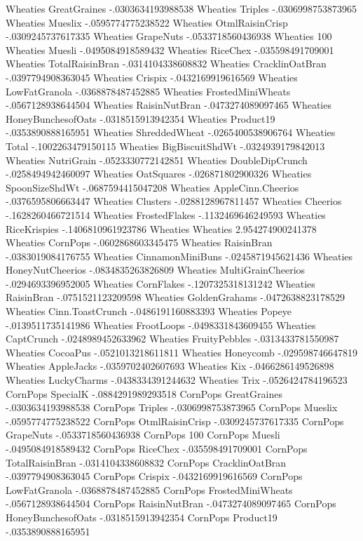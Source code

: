 Wheaties	GreatGraines	-.0303634193988538
Wheaties	Triples	-.0306998753873965
Wheaties	Mueslix	-.0595774775238522
Wheaties	OtmlRaisinCrisp	-.0309245737617335
Wheaties	GrapeNuts	-.0533718560436938
Wheaties	100%
Wheaties	Muesli	-.0495084918589432
Wheaties	RiceChex	-.035598491709001
Wheaties	TotalRaisinBran	-.0314104338608832
Wheaties	CracklinOatBran	-.0397794908363045
Wheaties	Crispix	-.0432169919616569
Wheaties	LowFatGranola	-.0368878487452885
Wheaties	FrostedMiniWheats	-.0567128938644504
Wheaties	RaisinNutBran	-.0473274089097465
Wheaties	HoneyBunchesofOats	-.0318515913942354
Wheaties	Product19	-.0353890888165951
Wheaties	ShreddedWheat	-.0265400538906764
Wheaties	Total	-.1002263479150115
Wheaties	BigBiscuitShdWt	-.0324939179842013
Wheaties	NutriGrain	-.0523330772142851
Wheaties	DoubleDipCrunch	-.0258494942460097
Wheaties	OatSquares	-.026871802900326
Wheaties	SpoonSizeShdWt	-.0687594415047208
Wheaties	AppleCinn.Cheerios	-.0376595806663447
Wheaties	Clusters	-.0288128967811457
Wheaties	Cheerios	-.1628260466721514
Wheaties	FrostedFlakes	-.1132469646249593
Wheaties	RiceKrispies	-.1406810961923786
Wheaties	Wheaties	2.954274900241378
Wheaties	CornPops	-.0602868603345475
Wheaties	RaisinBran	-.0383019084176755
Wheaties	CinnamonMiniBuns	-.0245871945621436
Wheaties	HoneyNutCheerios	-.0834835263826809
Wheaties	MultiGrainCheerios	-.0294693396952005
Wheaties	CornFlakes	-.1207325318131242
Wheaties	RaisinBran	-.0751521123209598
Wheaties	GoldenGrahams	-.0472638823178529
Wheaties	Cinn.ToastCrunch	-.0486191160883393
Wheaties	Popeye	-.0139511735141986
Wheaties	FrootLoops	-.0498331843609455
Wheaties	CaptCrunch	-.0248989452633962
Wheaties	FruityPebbles	-.0313433781550987
Wheaties	CocoaPus	-.0521013218611811
Wheaties	Honeycomb	-.029598746647819
Wheaties	AppleJacks	-.0359702402607693
Wheaties	Kix	-.0466286149526898
Wheaties	LuckyCharms	-.0438334391244632
Wheaties	Trix	-.0526424784196523
CornPops	SpecialK	-.0884291989293518
CornPops	GreatGraines	-.0303634193988538
CornPops	Triples	-.0306998753873965
CornPops	Mueslix	-.0595774775238522
CornPops	OtmlRaisinCrisp	-.0309245737617335
CornPops	GrapeNuts	-.0533718560436938
CornPops	100%
CornPops	Muesli	-.0495084918589432
CornPops	RiceChex	-.035598491709001
CornPops	TotalRaisinBran	-.0314104338608832
CornPops	CracklinOatBran	-.0397794908363045
CornPops	Crispix	-.0432169919616569
CornPops	LowFatGranola	-.0368878487452885
CornPops	FrostedMiniWheats	-.0567128938644504
CornPops	RaisinNutBran	-.0473274089097465
CornPops	HoneyBunchesofOats	-.0318515913942354
CornPops	Product19	-.0353890888165951
